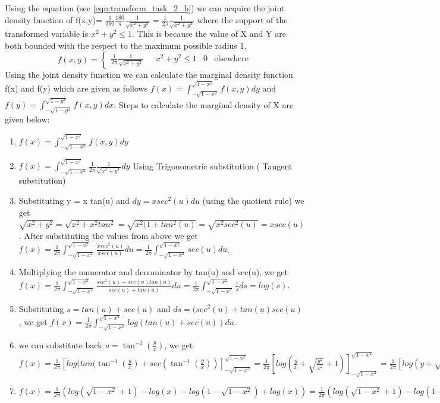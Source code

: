 Using the equation (see \ref{eqn:transform_task_2_b}) we can acquire the joint density function of f(x,y)= $\frac{1}{360}\frac{180}{\pi}\frac{1}{\sqrt{x^2+y^2}} = \frac{1}{2\pi}\frac{1}{\sqrt{x^2+y^2}}$ where the support of the transformed variable is $x^2+y^2 \leq 1$. This is because the value of X and Y are both bounded with the respect to the maximum possible radius 1.
\begin{equation}\label{eqn:density_task_2_b}
   f(x,y) =  \begin{cases*}
   \frac{1}{2\pi}\frac{1}{\sqrt{x^2+y^2}} &\text{ $x^2+y^2 \leq 1$}
    &0&\text{elsewhere}
\end{cases*}
\end{equation}
Using the joint density function we can calculate the marginal density function f(x) and f(y) which are given as follows $f(x) = \int_{-\sqrt{1-x^2}}^{\sqrt{1-x^2}} f(x,y) dy $ and $f(y) = \int_{-\sqrt{1-y^2}}^{\sqrt{1-y^2}} f(x,y) dx .$
Steps to calculate the marginal density of X are given below:
\begin{enumerate}\label{eqn:density_x_task_2_b_sol}
    \item $f(x) = \int_{-\sqrt{1-x^2}}^{\sqrt{1-x^2}} f(x,y) dy $
    \item $f(x) = \int_{-\sqrt{1-x^2}}^{\sqrt{1-x^2}}  \frac{1}{2\pi}\frac{1}{\sqrt{x^2+y^2}} dy$ Using Trigonometric substitution (\cite{wiki:trig} Tangent substitution)
    \item Substituting y = x tan(u) and $dy = x sec^2(u)du$ (using the quotient rule) we get $\sqrt{x^2+y^2}= \sqrt{x^2+x^2tan^2}= \sqrt{x^2(1+tan^2(u)} = \sqrt{x^2sec^2(u)} = x sec(u)$. \newline After substituting the values from above we get  $f(x) = \frac{1}{2\pi}\int_{-\sqrt{1-x^2}}^{\sqrt{1-x^2}} \frac{xsec^2(u)}{x sec(u)} du = \frac{1}{2\pi}\int_{-\sqrt{1-x^2}}^{\sqrt{1-x^2}} sec(u) du$.
    \item Multiplying the numerator and denominator by tan(u) and sec(u), we get $f(x) = \frac{1}{2\pi}\int_{-\sqrt{1-x^2}}^{\sqrt{1-x^2}} \frac{sec^2(u) + sec(u)tan(u)}{sec(u)+tan(u)}du = \frac{1}{2\pi}\int_{-\sqrt{1-x^2}}^{\sqrt{1-x^2}}\frac{1}{s} ds = log(s).$
    \item Substituting $s = tan(u) + sec(u)$ and $ds = (sec^2(u) +tan(u)sec(u)$, we get $f(x) = \frac{1}{2\pi}\int_{-\sqrt{1-x^2}}^{\sqrt{1-x^2}} log(tan(u) + sec(u)) du .$
    \item we can substitute back $u = \tan^{-1}(\frac{y}{x})$, we get $f(x) = \frac{1}{2\pi}[log(tan(\tan^{-1}(\frac{y}{x}) + sec(\tan^{-1}(\frac{y}{x}))]_{-\sqrt{1-x^2}}^{\sqrt{1-x^2}} = \frac{1}{2\pi}[log(\frac{y}{x} + \sqrt{\frac{y^2}{x^2}}+1)]_{-\sqrt{1-x^2}}^{\sqrt{1-x^2}} = \frac{1}{2\pi}[log(y + \sqrt{y^2+x^2}) -log(x))]_{-\sqrt{1-x^2}}^{\sqrt{1-x^2}}$
    \item $f(x) = \frac{1}{2\pi} (log(\sqrt{1-x^2}+1) - log(x) - log(1-\sqrt{1-x^2})+ log(x))= \frac{1}{2\pi} (log(\sqrt{1-x^2}+1)- log(1-\sqrt{1-x^2})) $
\end{enumerate} 
